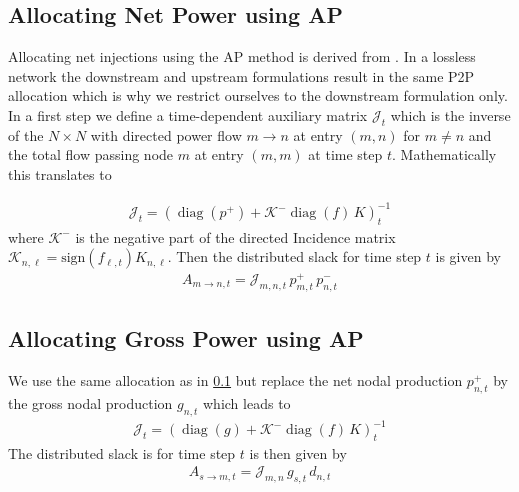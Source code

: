 \documentclass[11pt,twocolumn]{article}
\newcommand{\generation}{g_{s,t}}
\newcommand{\nodalgeneration}[1][n]{g_{#1,t}}
\newcommand{\flow}{f_{\ell,t}}
\newcommand{\demand}[1][n]{d_{#1,t}}
\newcommand{\netconsumption}[1][n]{p^{-}_{#1,t}}
\newcommand{\netproduction}[1][n]{p^{+}_{#1,t}}
\newcommand{\incidence}[1][n]{K_{#1,\ell}}
\newcommand{\allocategeneration}[1][s, n]{A_{#1,t}}
\newcommand{\allocatepeer}[1][m \rightarrow n]{A_{#1,t}}
\begin{document}
\subsection{Allocating Net Power using AP}
\label{sec:net_ap}

\newcommand{\incidenceM}{K}
\newcommand{\flowM}{f}
\newcommand{\injectionM}{p}
\newcommand{\slackM}{k}
\newcommand{\DirectedIncidence}{\mathcal{K}}
\newcommand{\InverseAPInjection}{\mathcal{J}}
\newcommand\diag[1]{\operatorname{diag}\left(#1\right)}


Allocating net injections using the AP method is derived from \cite{achayuthakan_electricity_2010}. In a lossless network the downstream and upstream formulations result in the same P2P allocation which is why we restrict ourselves to the downstream formulation only. In a first step we define a time-dependent auxiliary matrix $\InverseAPInjection_t$ which is the inverse of the $N\times N$ with directed power flow $m \rightarrow n$ at entry $(m, n)$ for $m \ne n$ and the total flow passing node $m$ at entry $\left( m, m\right)$ at time step $t$. Mathematically this translates to


\begin{align}
\InverseAPInjection_t = \left( \diag{\injectionM^+} + \DirectedIncidence^- \diag{\flowM} \, \incidenceM \right)_t^{-1} 
\end{align}
where $\DirectedIncidence^-$ is the negative part of the directed Incidence matrix $\DirectedIncidence_{n,\ell} = \text{sign}\left( \flow \right)  \incidence$. Then the distributed slack for time step $t$ is given by
\begin{align}
\allocatepeer = \InverseAPInjection_{m,n,t} \, \netproduction[m] \, \netconsumption
\end{align}

\subsection{Allocating Gross Power using AP}
\label{sec:gross_ap}

We use the same allocation as in \cref{sec:net_ap} but replace the net nodal production $\netproduction$ by the gross nodal production $\nodalgeneration$ which leads to  
\begin{align}
\InverseAPInjection_t = \left( \diag{g} + \DirectedIncidence^- \diag{\flowM} \, \incidenceM \right)_t^{-1} 
\end{align}
The distributed slack is for time step $t$ is then given by
\begin{align}
\allocategeneration[s \rightarrow m] = \InverseAPInjection_{m,n} \, \generation \, \demand
\end{align}
\end{document}
